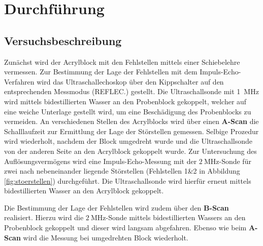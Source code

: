 \section{Durchführung}
\label{sec:Durchführung}



\subsection{Versuchsbeschreibung}
\label{sec:Versuchsbeschreibung}
Zunächst wird der Acrylblock mit den Fehlstellen mittels einer Schiebelehre vermessen.
Zur Bestimmung der Lage der Fehlstellen mit dem Impuls-Echo-Verfahren wird das Ultraschallechoskop über den Kippschalter auf den entsprechenden Messmodus (REFLEC.) gestellt.
Die Ultraschallsonde mit \SI{1}{\mega\Hz} wird mittels bidestillierten Wasser an den Probenblock gekoppelt, welcher auf eine weiche Unterlage gestellt wird, um eine Beschädigung des Probenblocks zu vermeiden.
An verschiedenen Stellen des Acrylblocks wird über einen \textbf{A-Scan} die Schalllaufzeit zur Ermittlung der Lage der Störstellen gemessen. Selbige Prozedur wird wiederholt, nachdem der Block umgedreht wurde und die Ultraschallsonde von der anderen Seite an den Acrylblock gekoppelt wurde.
Zur Untersuchung des Auflösungsvermögens wird eine Impuls-Echo-Messung mit der $\SI{2}{\mega\Hz}$-Sonde für zwei nach nebeneinander liegende Störstellen (Fehlstellen 1\&2 in Abbildung \ref{fig:stoerstellen}) durchgeführt.
Die Ultraschallsonde wird hierfür erneut mittels bidestillierten Wasser an den Acrylblock gekoppelt.

Die Bestimmung der Lage der Fehlstellen wird zudem über den \textbf{B-Scan} realisiert. Hierzu wird die $\SI{2}{\mega\Hz}$-Sonde mittels bidestillierten Wassers an den Probenblock gekoppelt und dieser wird langsam abgefahren.
Ebenso wie beim \textbf{A-Scan} wird die Messung bei umgedrehten Block wiederholt.
